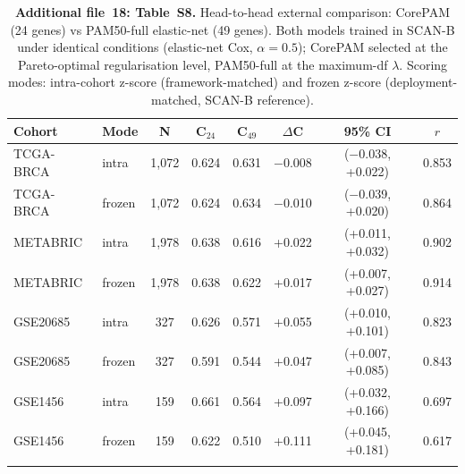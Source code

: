\documentclass[referee,lineno,pdflatex,sn-vancouver-num]{sn-jnl}
\begin{document}
\begin{table}[h]
\caption{\textbf{Additional file~18: Table~S8.} Head-to-head external comparison: CorePAM (24 genes) vs PAM50-full elastic-net (49 genes). Both models trained in SCAN-B under identical conditions (elastic-net Cox, $\alpha = 0.5$); CorePAM selected at the Pareto-optimal regularisation level, PAM50-full at the maximum-df $\lambda$. Scoring modes: intra-cohort z-score (framework-matched) and frozen z-score (deployment-matched, SCAN-B reference).}\label{tab:s8-headtohead}
\small
\begin{tabular}{@{}llcccccc@{}}
\toprule
Cohort & Mode & N & C$_{24}$ & C$_{49}$ & $\Delta$C & 95\% CI & $r$ \\
\midrule
TCGA-BRCA & intra & 1,072 & 0.624 & 0.631 & $-$0.008 & ($-$0.038, +0.022) & 0.853 \\
TCGA-BRCA & frozen & 1,072 & 0.624 & 0.634 & $-$0.010 & ($-$0.039, +0.020) & 0.864 \\
METABRIC & intra & 1,978 & 0.638 & 0.616 & +0.022 & (+0.011, +0.032) & 0.902 \\
METABRIC & frozen & 1,978 & 0.638 & 0.622 & +0.017 & (+0.007, +0.027) & 0.914 \\
GSE20685 & intra & 327 & 0.626 & 0.571 & +0.055 & (+0.010, +0.101) & 0.823 \\
GSE20685 & frozen & 327 & 0.591 & 0.544 & +0.047 & (+0.007, +0.085) & 0.843 \\
GSE1456 & intra & 159 & 0.661 & 0.564 & +0.097 & (+0.032, +0.166) & 0.697 \\
GSE1456 & frozen & 159 & 0.622 & 0.510 & +0.111 & (+0.045, +0.181) & 0.617 \\
\botrule
\end{tabular}
\end{table}


\end{document}
